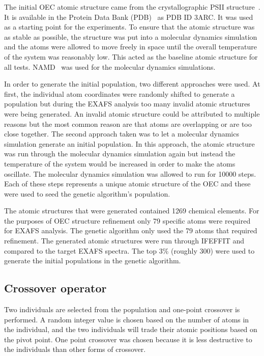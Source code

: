 \documentclass[conference]{IEEEtran}
\begin{document}
The initial OEC atomic structure came from the crystallographic PSII structure~\cite{umena2011crystal}. It is available in the Protein Data Bank (PDB)~\cite{databank} as PDB ID 3ARC. It was used as a starting point for the experiments. To ensure that the atomic structure was as stable as possible, the structure was put into a molecular dynamics simulation and the atoms were allowed to move freely in space until the overall temperature of the system was reasonably low. This acted as the baseline atomic structure for all tests. NAMD~\cite{namd} was used for the molecular dynamics simulations.

In order to generate the initial population, two different approaches were used. At first, the individual atom coordinates were randomly shifted to generate a population but during the EXAFS analysis too many invalid atomic structures were being generated. An invalid atomic structure could be attributed to multiple reasons but the most common reason are that atoms are overlapping or are too close together. The second approach taken was to let a molecular dynamics simulation generate an initial population. In this approach, the atomic structure was run through the molecular dynamics simulation again but instead the temperature of the system would be increased in order to make the atoms oscillate. The molecular dynamics simulation was allowed to run for 10000 steps. Each of these steps represents a unique atomic structure of the OEC and these were used to seed the genetic algorithm's population.

The atomic structures that were generated contained 1269 chemical elements. For the purposes of OEC structure refinement only 79 specific atoms were required for EXAFS analysis. The genetic algorithm only used the 79 atoms that required refinement. The generated atomic structures were run through IFEFFIT and compared to the target EXAFS spectra. The top 3\% (roughly 300) were used to generate the initial populations in the genetic algorithm.

\subsection{Crossover operator}

Two individuals are selected from the population and one-point crossover is performed. A random integer value is chosen based on the number of atoms in the individual, and the two individuals will trade their atomic positions based on the pivot point. One point crossover was chosen because it is less destructive to the individuals than other forms of crossover.
\end{document}
